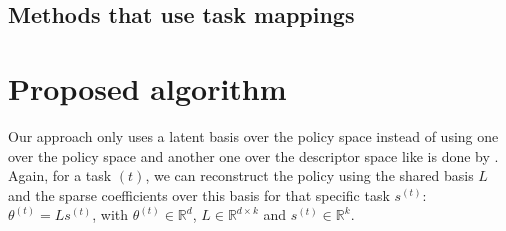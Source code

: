 \documentclass[a4paper]{article}
\begin{document}

\subsection{Methods that use task mappings} %
\label{sub:methods_that_use_task_mappings}


\section{Proposed algorithm}
\label{sec:proposed_algorithm} %
Our approach only uses a latent basis over the policy space instead of using one over the policy space and another one over the descriptor space like is done by \cite{Isele2016UsingLearning}. Again, for a task $(t)$, we can reconstruct the policy using the shared basis $L$ and the sparse coefficients over this basis for that specific task $s^{(t)}$: $\theta^{(t)} = Ls^{(t)}$, with $\theta^{(t)} \in \mathbb{R}^d$, $L \in \mathbb{R}^{d \times k}$ and $s^{(t)} \in \mathbb{R}^k$.\\
\end{document}
